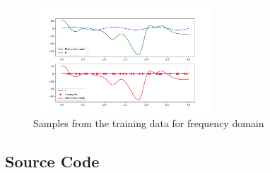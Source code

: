 \documentclass{article}
\begin{document}
\begin{figure}[htbp!]
    \centering
    \includegraphics[width=0.6\textwidth]{plots/bnn_oscilator1_pinn.png}
    \caption{Samples from the training data for frequency domain}
    \label{fig:training_samples}
\end{figure}
\newpage
\begin{appendices}
\section{Source Code}

\end{appendices}

\printbibliography
\end{document}
